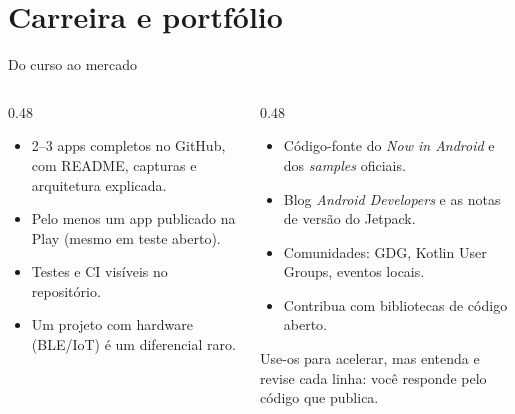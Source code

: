 \documentclass[aspectratio=169,10pt]{beamer}
\begin{document}
\section{Carreira e portfólio}

\begin{frame}{Do curso ao mercado}
  \begin{columns}[T]
    \begin{column}{0.48\textwidth}
      \begin{conceito}
        \begin{itemize}
          \item 2--3 apps completos no GitHub, com README, capturas e arquitetura explicada.
          \item Pelo menos um app publicado na Play (mesmo em teste aberto).
          \item Testes e CI visíveis no repositório.
          \item Um projeto com hardware (BLE/IoT) é um diferencial raro.
        \end{itemize}
      \end{conceito}
    \end{column}
    \begin{column}{0.48\textwidth}
      \begin{dica}
        \begin{itemize}
          \item Código-fonte do \emph{Now in Android} e dos \emph{samples} oficiais.
          \item Blog \emph{Android Developers} e as notas de versão do Jetpack.
          \item Comunidades: GDG, Kotlin User Groups, eventos locais.
          \item Contribua com bibliotecas de código aberto.
        \end{itemize}
      \end{dica}
      \begin{atencao}[Assistentes de IA]
        Use-os para acelerar, mas entenda e revise cada linha: você responde pelo código que publica.
      \end{atencao}
    \end{column}
  \end{columns}
\end{frame}

\end{document}
